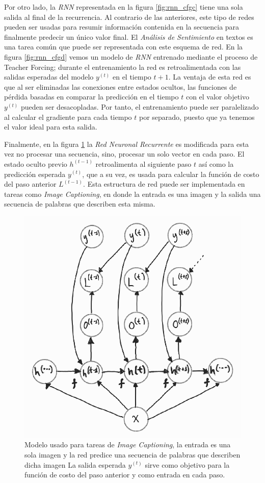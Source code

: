 Por otro lado, la \textit{RNN} representada en la figura \ref{fig:rnn_cfgc} tiene una sola salida al
final de la recurrencia.
Al contrario de las anteriores, este tipo de redes pueden ser usadas para resumir
información contenida en la secuencia para finalmente predecir un único valor final.
El \textit{Análisis de Sentimiento} en textos es una tarea común que puede ser representada con este esquema
de red. En la figura \ref{fig:rnn_cfgd} vemos un modelo de \textit{RNN} entrenado mediante el proceso de
Teacher Forcing; durante el entrenamiento la red es retroalimentada con las salidas
esperadas del modelo $y^{(t)}$ en el tiempo $t+1$. La ventaja de esta red es que al ser eliminadas
las conexiones entre estados ocultos, las funciones de pérdida basadas en comparar la predicción en
el tiempo $t$ con el valor objetivo $y^{(t)}$ pueden ser desacopladas. Por tanto, el entrenamiento
puede ser paralelizado al calcular el gradiente para cada tiempo $t$ por separado, puesto que ya
tenemos el valor ideal para esta salida.

Finalmente, en la figura \ref{fig:rnn_cfge} la \textit{Red Neuronal Recurrente} es modificada para esta vez
no procesar una secuencia, sino, procesar un solo vector en cada paso. El estado oculto
previo $h^{(t-1)}$ retroalimenta al siguiente paso $t$ así como la predicción esperada $y^{(t)}$, que
a su vez, es usada para calcular la función de costo del paso anterior $L^{(t-1)}$. Esta estructura de
red puede ser implementada en tareas como \textit{Image Captioning}, en donde la entrada es una imagen y la salida
una secuencia de palabras que describen esta misma.

\begin{figure}[!ht]
\centering
\includegraphics[width=.4\textwidth]{Chapters/2. Transformer/Figures/rnn/rnn_cfge.png}
\caption{Modelo usado para tareas de \textit{Image Captioning}, la entrada es una
sola imagen y la red predice una secuencia de palabras que describen dicha imagen La salida esperada
$y^{(t)}$ sirve como objetivo para la función de costo del paso anterior y como entrada en cada paso.}
\label{fig:rnn_cfge}
\end{figure}


